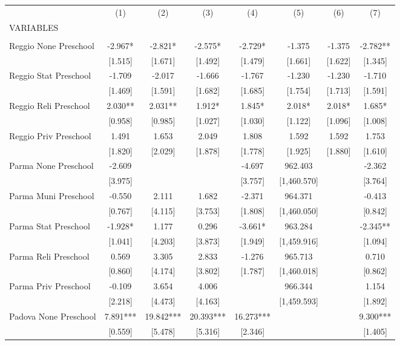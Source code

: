 \begin{tabular}{lccccccc} \hline
 & (1) & (2) & (3) & (4) & (5) & (6) & (7) \\
VARIABLES &  &  &  &  &  &  &  \\ \hline
 &  &  &  &  &  &  &  \\
Reggio None Preschool & -2.967* & -2.821* & -2.575* & -2.729* & -1.375 & -1.375 & -2.782** \\
 & [1.515] & [1.671] & [1.492] & [1.479] & [1.661] & [1.622] & [1.345] \\
Reggio Stat Preschool & -1.709 & -2.017 & -1.666 & -1.767 & -1.230 & -1.230 & -1.710 \\
 & [1.469] & [1.591] & [1.682] & [1.685] & [1.754] & [1.713] & [1.591] \\
Reggio Reli Preschool & 2.030** & 2.031** & 1.912* & 1.845* & 2.018* & 2.018* & 1.685* \\
 & [0.958] & [0.985] & [1.027] & [1.030] & [1.122] & [1.096] & [1.008] \\
Reggio Priv Preschool & 1.491 & 1.653 & 2.049 & 1.808 & 1.592 & 1.592 & 1.753 \\
 & [1.820] & [2.029] & [1.878] & [1.778] & [1.925] & [1.880] & [1.610] \\
Parma None Preschool & -2.609 &  &  & -4.697 & 962.403 &  & -2.362 \\
 & [3.975] &  &  & [3.757] & [1,460.570] &  & [3.764] \\
Parma Muni Preschool & -0.550 & 2.111 & 1.682 & -2.371 & 964.371 &  & -0.413 \\
 & [0.767] & [4.115] & [3.753] & [1.808] & [1,460.050] &  & [0.842] \\
Parma Stat Preschool & -1.928* & 1.177 & 0.296 & -3.661* & 963.284 &  & -2.345** \\
 & [1.041] & [4.203] & [3.873] & [1.949] & [1,459.916] &  & [1.094] \\
Parma Reli Preschool & 0.569 & 3.305 & 2.833 & -1.276 & 965.713 &  & 0.710 \\
 & [0.860] & [4.174] & [3.802] & [1.787] & [1,460.018] &  & [0.862] \\
Parma Priv Preschool & -0.109 & 3.654 & 4.006 &  & 966.344 &  & 1.154 \\
 & [2.218] & [4.473] & [4.163] &  & [1,459.593] &  & [1.892] \\
Padova None Preschool & 7.891*** & 19.842*** & 20.393*** & 16.273*** &  &  & 9.300*** \\
 & [0.559] & [5.478] & [5.316] & [2.346] &  &  & [1.405] \\

\end{tabular}

